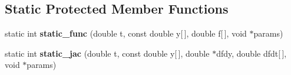 \subsection*{Static Protected Member Functions}
\begin{DoxyCompactItemize}
\item 
static int {\bfseries static\+\_\+func} (double t, const double y\mbox{[}$\,$\mbox{]}, double f\mbox{[}$\,$\mbox{]}, void $\ast$params)\hypertarget{classkukadu_1_1DMPExecutor_ac58ec7a3b98134bcb84aff2b81ffc5c4}{}\label{classkukadu_1_1DMPExecutor_ac58ec7a3b98134bcb84aff2b81ffc5c4}

\item 
static int {\bfseries static\+\_\+jac} (double t, const double y\mbox{[}$\,$\mbox{]}, double $\ast$dfdy, double dfdt\mbox{[}$\,$\mbox{]}, void $\ast$params)\hypertarget{classkukadu_1_1DMPExecutor_a10d8f15cdf66da21fc9e3d4a4d3555b8}{}\label{classkukadu_1_1DMPExecutor_a10d8f15cdf66da21fc9e3d4a4d3555b8}

\end{DoxyCompactItemize}
